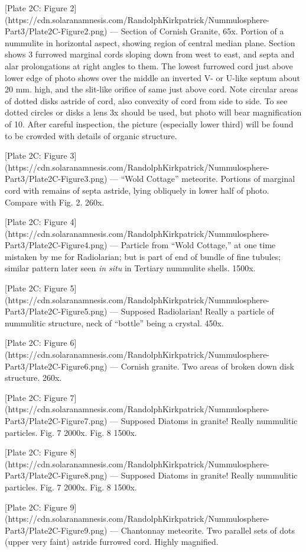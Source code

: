 \documentclass[a4paper, 12pt, oneside]{article}
\begin{document}
[Plate 2C: Figure 2](https://cdn.solaranamnesis.com/RandolphKirkpatrick/Nummulosphere-Part3/Plate2C-Figure2.png) --- Section of Cornish Granite, 65x. Portion of a nummulite in horizontal aspect, showing region of central median plane. Section shows 3 furrowed marginal cords sloping down from west to east, and septa and alar prolongations at right angles to them. The lowest furrowed cord just above lower edge of photo shows over the middle an inverted V- or U-like septum about 20 mm. high, and the slit-like orifice of same just above cord. Note circular areas of dotted disks astride of cord, also convexity of cord from side to side. To see dotted circles or disks a lens 3x should be used, but photo will bear magnification of 10. After careful inspection, the picture (especially lower third) will be found to be crowded with details of organic structure.

[Plate 2C: Figure 3](https://cdn.solaranamnesis.com/RandolphKirkpatrick/Nummulosphere-Part3/Plate2C-Figure3.png) --- ``Wold Cottage'' meteorite. Portions of marginal cord with remains of septa astride, lying obliquely in lower half of photo. Compare with Fig. 2. 260x.

[Plate 2C: Figure 4](https://cdn.solaranamnesis.com/RandolphKirkpatrick/Nummulosphere-Part3/Plate2C-Figure4.png) --- Particle from ``Wold Cottage,'' at one time mistaken by me for Radiolarian; but is part of end of bundle of fine tubules; similar pattern later seen \emph{in situ} in Tertiary nummulite shells. 1500x.

[Plate 2C: Figure 5](https://cdn.solaranamnesis.com/RandolphKirkpatrick/Nummulosphere-Part3/Plate2C-Figure5.png) --- Supposed Radiolarian! Really a particle of nummulitic structure, neck of ``bottle'' being a crystal. 450x.

[Plate 2C: Figure 6](https://cdn.solaranamnesis.com/RandolphKirkpatrick/Nummulosphere-Part3/Plate2C-Figure6.png) --- Cornish granite. Two areas of broken down disk structure. 260x.

[Plate 2C: Figure 7](https://cdn.solaranamnesis.com/RandolphKirkpatrick/Nummulosphere-Part3/Plate2C-Figure7.png) --- Supposed Diatoms in granite! Really nummulitic particles. Fig. 7 2000x. Fig. 8 1500x.

[Plate 2C: Figure 8](https://cdn.solaranamnesis.com/RandolphKirkpatrick/Nummulosphere-Part3/Plate2C-Figure8.png) --- Supposed Diatoms in granite! Really nummulitic particles. Fig. 7 2000x. Fig. 8 1500x.

[Plate 2C: Figure 9](https://cdn.solaranamnesis.com/RandolphKirkpatrick/Nummulosphere-Part3/Plate2C-Figure9.png) --- Chantonnay meteorite. Two parallel sets of dots (upper very faint) astride furrowed cord. Highly magnified.
\end{document}
